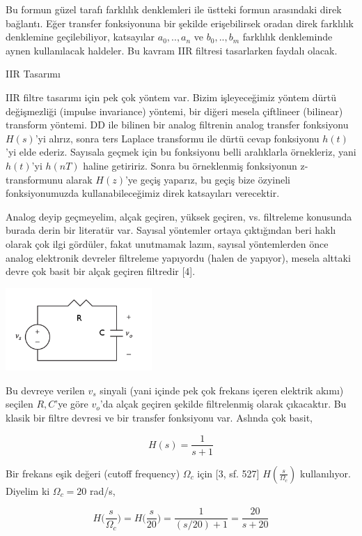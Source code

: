 \documentclass[12pt,fleqn]{article}\usepackage{../../common}
\begin{document}
Bu formun güzel tarafı farklılık denklemleri ile üstteki formun arasındaki
direk bağlantı. Eğer transfer fonksiyonuna bir şekilde erişebilirsek oradan
direk farklılık denklemine geçilebiliyor, katsayılar $a_0,..,a_n$ ve
$b_0,..,b_m$ farklılık denkleminde aynen kullanılacak haldeler. Bu kavram
IIR filtresi tasarlarken faydalı olacak.

IIR Tasarımı

IIR filtre tasarımı için pek çok yöntem var. Bizim işleyeceğimiz yöntem
dürtü değişmezliği (impulse invariance) yöntemi, bir diğeri mesela
çiftlineer (bilinear) transform yöntemi. DD ile bilinen bir analog
filtrenin analog transfer fonksiyonu $H(s)$'yi alırız, sonra ters Laplace
transformu ile dürtü cevap fonksiyonu $h(t)$'yi elde ederiz. Sayısala
geçmek için bu fonksiyonu belli aralıklarla örnekleriz, yani $h(t)$'yi
$h(nT)$ haline getiririz. Sonra bu örneklenmiş fonksiyonun z-transformunu
alarak $H(z)$'ye geçiş yaparız, bu geçiş bize özyineli fonksiyonumuzda
kullanabileceğimiz direk katsayıları verecektir.

Analog deyip geçmeyelim, alçak geçiren, yüksek geçiren, vs. filtreleme
konusunda burada derin bir literatür var. Sayısal yöntemler ortaya
çıktığından beri haklı olarak çok ilgi gördüler, fakat unutmamak lazım,
sayısal yöntemlerden önce analog elektronik devreler filtreleme yapıyordu
(halen de yapıyor), mesela alttaki devre çok basit bir alçak geçiren
filtredir [4]. 

\includegraphics[width=15em]{compscieng_1_25_01.png}

Bu devreye verilen $v_s$ sinyali (yani içinde pek çok frekans içeren
elektrik akımı) seçilen $R,C$'ye göre $v_o$'da alçak geçiren şekilde
filtrelenmiş olarak çıkacaktır. Bu klasik bir filtre devresi ve bir
transfer fonksiyonu var. Aslında çok basit,

$$ H(s) = \frac{1}{s + 1}$$

Bir frekans eşik değeri (cutoff frequency) $\Omega_c$ için [3, sf. 527]
$H(\frac{s}{\Omega_c})$ kullanılıyor. Diyelim ki $\Omega_c = 20$ rad/s,

$$ 
H \bigg( \frac{s}{\Omega_c} \bigg) = H\bigg( \frac{s}{20} \bigg) 
= \frac{1}{(s/20) + 1} = \frac{20}{s + 20}
$$
\end{document}
